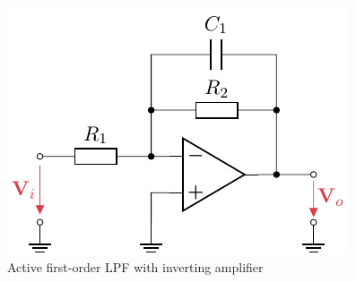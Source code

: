 \begin{figure}[!htb]
  \centering
  \includegraphics[scale=1]{figures/electronics/lowpass/lp_active_1ord_inv_amp/lp_active_1ord_inv_amp}
  \caption[Active first-order \ac{LPF} with inverting amplifier]{Active first-order \ac{LPF} with inverting amplifier%
    \label{fig:lp_active_1ord_inv_amp}}
\end{figure}

%
%
%

